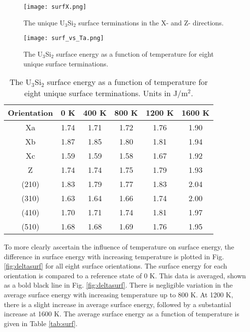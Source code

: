 \documentclass[review]{elsarticle}
\begin{document}
\begin{figure}[h]
 \centering
 \texttt{[image: surfX.png]} 
 \caption{The unique U$_{3}$Si$_{2}$ surface terminations in the X- and Z- directions. }
 \label{fig:surfT}
\end{figure}

\begin{figure}[h]
 \centering
 \texttt{[image: surf\_vs\_Ta.png]} 
 \caption{The U$_{3}$Si$_{2}$ surface energy as a function of temperature for eight unique surface terminations. }
 \label{fig:surfT}
\end{figure}

\begin{table}[h]
\caption{The U$_{3}$Si$_{2}$ surface energy as a function of temperature for eight unique surface terminations. Units in J/m$^{2}$.} \label{tab:surfT}
\begin{center}
\begin{tabular}{|c|c|c|c|c|c|}
	\hline
	Orientation & 0 K & 400 K & 800 K & 1200 K & 1600 K\\
	 \hline
	 Xa & 1.74	 & 1.71 & 1.72 & 1.76 & 1.90 \\
	 Xb & 1.87 & 1.85 & 1.80 & 1.81 & 1.94 \\
	 Xc & 1.59	 & 1.59 & 1.58 & 1.67 & 1.92 \\
	 Z & 1.74 & 1.74 & 1.75 & 1.79 & 1.93 \\
	 (210) & 1.83 & 	1.79 & 1.77 & 1.83 & 2.04 \\
	 (310) & 1.63 & 1.64 & 1.66 & 1.74 & 2.00 \\	 
	 (410) & 1.70 & 1.71 & 1.74 & 1.81 & 1.97 \\
	 (510) & 1.68 & 1.68 & 1.69 & 1.76 & 1.95 \\
	 \hline
\end{tabular}
\end{center}
\label{default}
\end{table}

\FloatBarrier

To more clearly ascertain the influence of temperature on surface energy, the difference in surface energy with increasing temperature is plotted in Fig. \ref{fig:deltasurf} for all eight surface orientations. The surface energy for each orientation is compared to a reference state of 0 K. This data is averaged, shown as a bold black line in Fig. \ref{fig:deltasurf}. There is negligible variation in the average surface energy with increasing temperature up to 800 K. At 1200 K, there is a slight increase in average surface energy, followed by a substantial increase at 1600 K. The average surface energy as a function of temperature is given in Table \ref{tab:surf}. 
\end{document}
